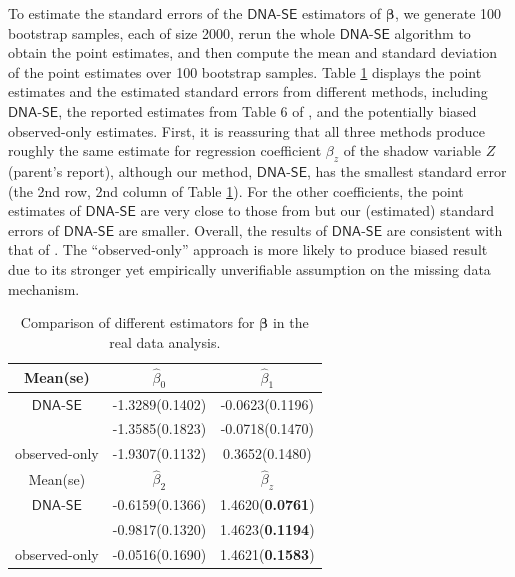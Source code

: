 \documentclass{article}
\def\dnase{{\mathsf{DNA\mbox{-}SE}}}
\theoremstyle{plain}
\theoremstyle{definition}
\theoremstyle{remark}
\def\bbeta{\boldsymbol{\beta}}
\def\hat{\widehat}
\begin{document}
To estimate the standard errors of the $\dnase$ estimators of $\bbeta$, we generate 100 bootstrap samples, each of size 2000, rerun the whole $\dnase$ algorithm to obtain the point estimates, and then compute the mean and standard deviation of the point estimates over 100 bootstrap samples. Table \ref{real_data_table} displays the point estimates and the estimated standard errors from different methods, including $\dnase$, the reported estimates from Table 6 of \citet{zhao2022versatile}, and the potentially biased observed-only estimates. First, it is reassuring that all three methods produce roughly the same estimate for regression coefficient $\beta_{z}$ of the shadow variable $Z$ (parent's report), although our method, $\dnase$, has the smallest standard error (the 2nd row, 2nd column of Table \ref{real_data_table}). For the other coefficients, the point estimates of $\dnase$ are very close to those from \citet{zhao2022versatile} but our (estimated) standard errors of $\dnase$ are smaller. Overall, the results of $\dnase$ are consistent with that of \citet{zhao2022versatile}. The ``observed-only'' approach is more likely to produce biased result due to its stronger yet empirically unverifiable assumption on the missing data mechanism.
\begin{table}[htbp]
\setlength\tabcolsep{3pt}
\small
    \centering
    \caption{Comparison of different estimators for $\bbeta$ in the real data analysis.}
    \vskip 0.15in
    \begin{sc}
    \begin{tabular}{ccc}
        \toprule
        Mean(se) &  $\hat{\beta}_{0}$ &  $\hat{\beta}_{1}$ \\
        \midrule
        $\dnase$ & -1.3289(0.1402) & -0.0623(0.1196)  \\
        \citet{zhao2022versatile} & -1.3585(0.1823) & -0.0718(0.1470)\\
        observed-only & -1.9307(0.1132) & 0.3652(0.1480) \\
        \midrule
        Mean(se) & $\hat{\beta}_{2}$ & $\hat{\beta}_{z}$ \\
        \midrule
        $\dnase$ & -0.6159(0.1366) & 1.4620(\textbf{0.0761}) \\
        \citet{zhao2022versatile} & -0.9817(0.1320) & 1.4623(\textbf{0.1194}) \\
        observed-only & -0.0516(0.1690) & 1.4621(\textbf{0.1583}) \\
        \bottomrule
    \end{tabular}
    \end{sc}\label{real_data_table}
\end{table}
\end{document}
